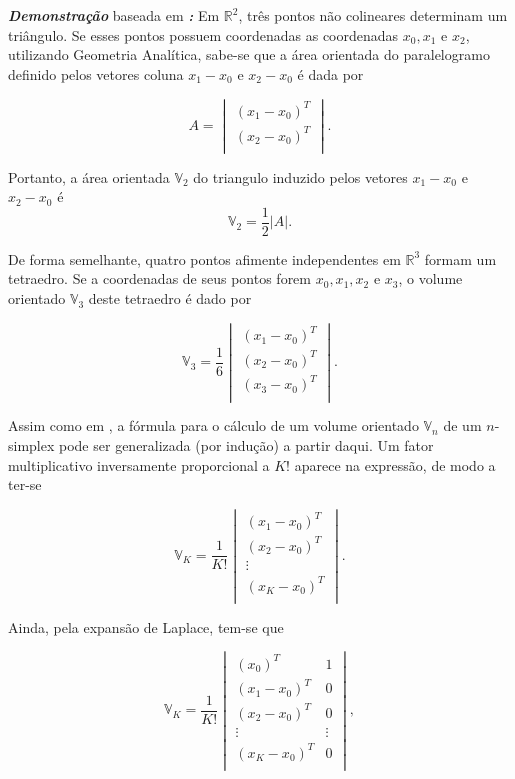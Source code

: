 \textbf{\textit{Demonstração}} baseada em \cite{douglasGD}\textit{\textbf{:}} Em $\mathbb{R}^2$, três pontos não colineares determinam um triângulo. Se esses pontos possuem coordenadas as coordenadas $x_0, x_1$ e $x_2$, utilizando Geometria Analítica, sabe-se que a área orientada do paralelogramo definido pelos vetores coluna $x_1-x_0$ e $x_2-x_0$ é dada por

$$ A = \begin{vmatrix}
(x_1-x_0)^T \\
(x_2-x_0)^T \\
\end{vmatrix}.$$

Portanto, a área orientada $\mathbb{V}_2$ do triangulo induzido pelos vetores $x_1-x_0$ e $x_2-x_0$ é
$$\mathbb{V}_2 = \frac{1}{2}|A|.$$

De forma semelhante, quatro pontos afimente independentes em $\mathbb{R}^3$ formam um tetraedro. Se a coordenadas de seus pontos forem $x_0,x_1,x_2$ e $x_3$, o volume orientado $\mathbb{V}_3$ deste tetraedro é dado por 

$$ \mathbb{V}_3 = \frac{1}{6}\begin{vmatrix}
(x_1-x_0)^T \\
(x_2-x_0)^T \\
(x_3-x_0)^T \\
\end{vmatrix}.$$

Assim como em \cite{hanson1994geometry}, a fórmula para o cálculo de um volume orientado $\mathbb{V}_n$ de um $n$-simplex pode ser generalizada (por indução) a partir daqui. Um fator multiplicativo inversamente proporcional a $K!$ aparece na expressão, de modo a ter-se

$$\mathbb{V}_K = \frac{1}{K!}\begin{vmatrix}
(x_1-x_0)^T \\
(x_2-x_0)^T \\
\vdots \\
(x_K-x_0)^T \\
\end{vmatrix}.$$

Ainda, pela expansão de Laplace, tem-se que

$$\mathbb{V}_K = \frac{1}{K!}\begin{vmatrix}
(x_0)^T & 1\\
(x_1-x_0)^T & 0\\
(x_2-x_0)^T & 0\\
\vdots & \vdots\\
(x_K-x_0)^T & 0\\
\end{vmatrix},$$

